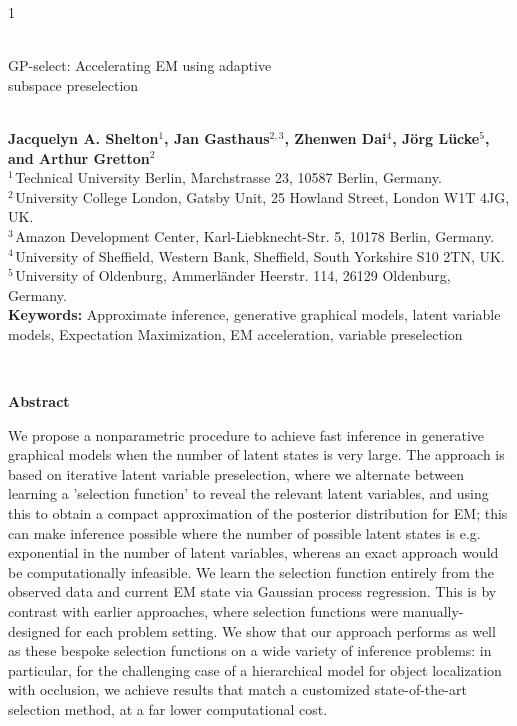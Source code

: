 \documentclass[12pt]{article}
\begin{document}
\hspace{13.9cm}1

\ \vspace{20mm}\\ 

{\LARGE GP-select: Accelerating EM using adaptive \\subspace preselection}

\ \\
{\bf \large Jacquelyn A. Shelton$^{\displaystyle 1}$, Jan Gasthaus$^{\displaystyle 2,3}$, Zhenwen Dai$^{\displaystyle 4}$, J\"org L\"{u}cke$^{\displaystyle 5}$, and Arthur Gretton$^{\displaystyle 2}$}\\
{$^{\displaystyle 1 \,}$Technical University Berlin, Marchstrasse 23, 10587 Berlin, Germany.}\\
{$^{\displaystyle 2 \,}$University College London, Gatsby Unit, 25 Howland Street, London W1T 4JG, UK.}\\
{$^{\displaystyle 3 \,}$Amazon Development Center, Karl-Liebknecht-Str. 5, 10178 Berlin, Germany.}\\
{$^{\displaystyle 4 \,}$University of Sheffield, Western Bank, Sheffield, South Yorkshire S10 2TN, UK.}\\
{$^{\displaystyle 5 \,}$University of Oldenburg, Ammerl\"ander Heerstr. 114, 26129 Oldenburg, Germany.}\\
{\bf Keywords:} Approximate inference, generative graphical models, latent variable models, Expectation Maximization, EM acceleration, variable preselection

\thispagestyle{empty}
%
\ \vspace{-0mm}\\
%
\begin{center} 
{\bf Abstract} 
\end{center}
We propose a nonparametric procedure to achieve fast inference in generative graphical models when the number of latent states is very large.
 The approach is based on iterative latent variable preselection, where we alternate between learning a 'selection function' to reveal the relevant latent variables, and using this to obtain a compact approximation of the posterior distribution for EM; this can make inference possible where the number of possible latent states is e.g. exponential in the number of latent variables, whereas an exact approach would be computationally infeasible.
We learn the selection function entirely from the observed data and current EM state via Gaussian process regression. This is by contrast with earlier approaches, where selection functions were manually-designed for each problem setting.
We show that our approach performs as well as these bespoke selection functions on a wide variety of inference problems: in particular, for the challenging case of a hierarchical model for object localization with occlusion, we achieve results that match a customized state-of-the-art selection method,  at a far lower computational cost.
\end{document}
